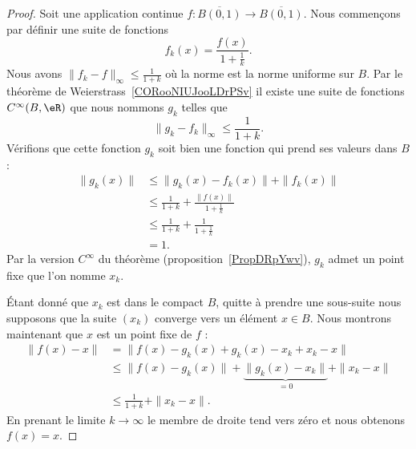 \begin{proof}
	Soit une application continue \(f \colon \overline{B(0,1)}\to \overline{B(0,1)}  \). Nous commençons par définir une suite de fonctions
	\begin{equation}
		f_k(x)=\frac{ f(x) }{ 1+\frac{1}{ k } }.
	\end{equation}
	Nous avons \( \| f_k-f \|_{\infty}\leq \frac{1}{ 1+k }\) où la norme est la norme uniforme sur \( B\). Par le théorème de Weierstrass~\ref{CORooNIUJooLDrPSv} il existe une suite de fonctions \(  C^{\infty}(B,\eR)\) que nous nommons \( g_k\) telles que
	\begin{equation}
		\|  g_k-f_k\|_{\infty}\leq\frac{1}{ 1+k }.
	\end{equation}
	Vérifions que cette fonction \( g_k\) soit bien une fonction qui prend ses valeurs dans \( B\) :
	\begin{subequations}
		\begin{align}
			\| g_k(x) \| & \leq \| g_k(x)-f_k(x) \|+\| f_k(x) \|                       \\
			             & \leq \frac{1}{ 1+k }+\frac{ \| f(x) \| }{ 1+\frac{1}{ k } } \\
			             & \leq \frac{1}{ 1+k}+\frac{1}{ 1+\frac{1}{ k } }             \\
			             & =1.
		\end{align}
	\end{subequations}
	Par la version \(  C^{\infty}\) du théorème (proposition~\ref{PropDRpYwv}), \( g_k\) admet un point fixe que l'on nomme \( x_k\).

	Étant donné que \( x_k\) est dans le compact \( B\), quitte à prendre une sous-suite nous supposons que la suite \( (x_k)\) converge vers un élément \( x\in B\). Nous montrons maintenant que \( x\) est un point fixe de \( f\) :
	\begin{subequations}
		\begin{align}
			\| f(x)-x \| & =\| f(x)-g_k(x)+g_k(x)-x_k+x_k-x \|                                    \\
			             & \leq \| f(x)-g_k(x) \| +\underbrace{\| g_k(x)-x_k \|}_{=0}+\| x_k-x \| \\
			             & \leq \frac{1}{ 1+k }+\| x_k-x \|.
		\end{align}
	\end{subequations}
	En prenant le limite \( k\to\infty\) le membre de droite tend vers zéro et nous obtenons \( f(x)=x\).
\end{proof}

